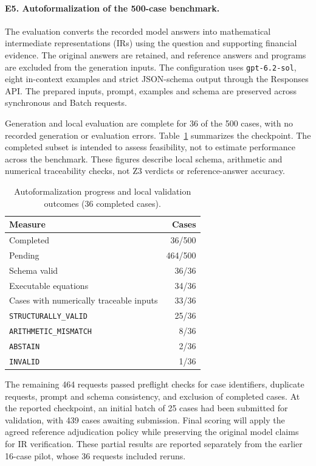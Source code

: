 \begingroup\sloppy
\paragraph{E5. Autoformalization of the 500-case benchmark.}
The evaluation converts the recorded model answers into mathematical intermediate representations (IRs) using the question and supporting financial evidence. The original answers are retained, and reference answers and programs are excluded from the generation inputs. The configuration uses \texttt{gpt-6.2-sol}, eight in-context examples and strict JSON-schema output through the Responses API. The prepared inputs, prompt, examples and schema are preserved across synchronous and Batch requests.

Generation and local evaluation are complete for 36 of the 500 cases, with no recorded generation or evaluation errors. Table~\ref{tab:autof-500-progress} summarizes the checkpoint. The completed subset is intended to assess feasibility, not to estimate performance across the benchmark. These figures describe local schema, arithmetic and numerical traceability checks, not Z3 verdicts or reference-answer accuracy.

\begin{table}[htbp]
\centering
\small
\caption{Autoformalization progress and local validation outcomes (36 completed cases).}
\label{tab:autof-500-progress}
\begin{tabular}{lr}
\hline
Measure & Cases \\
\hline
Completed & 36/500 \\
Pending & 464/500 \\
Schema valid & 36/36 \\
Executable equations & 34/36 \\
Cases with numerically traceable inputs & 33/36 \\
\hline
\texttt{STRUCTURALLY\_VALID} & 25/36 \\
\texttt{ARITHMETIC\_MISMATCH} & 8/36 \\
\texttt{ABSTAIN} & 2/36 \\
\texttt{INVALID} & 1/36 \\
\hline
\end{tabular}
\end{table}

The remaining 464 requests passed preflight checks for case identifiers, duplicate requests, prompt and schema consistency, and exclusion of completed cases. At the reported checkpoint, an initial batch of 25 cases had been submitted for validation, with 439 cases awaiting submission. Final scoring will apply the agreed reference adjudication policy while preserving the original model claims for IR verification. These partial results are reported separately from the earlier 16-case pilot, whose 36 requests included reruns.

